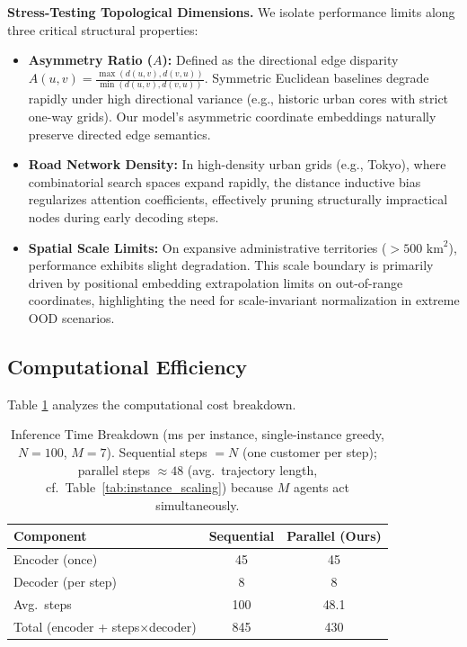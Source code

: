 \documentclass[journal,twoside,web]{ieeecolor}
\theoremstyle{definition}
\theoremstyle{remark}
\theoremstyle{definition}
\begin{document}
\noindent\textbf{Stress-Testing Topological Dimensions.}
We isolate performance limits along three critical structural properties:
\begin{itemize}
\item \textbf{Asymmetry Ratio ($A$):} Defined as the directional edge disparity $A(u, v) = \frac{\max(d(u, v), d(v, u))}{\min(d(u, v), d(v, u))}$. Symmetric Euclidean baselines degrade rapidly under high directional variance (e.g., historic urban cores with strict one-way grids). Our model's asymmetric coordinate embeddings naturally preserve directed edge semantics.
\item \textbf{Road Network Density:} In high-density urban grids (e.g., Tokyo), where combinatorial search spaces expand rapidly, the distance inductive bias regularizes attention coefficients, effectively pruning structurally impractical nodes during early decoding steps.
\item \textbf{Spatial Scale Limits:} On expansive administrative territories ($>500\text{ km}^2$), performance exhibits slight degradation. This scale boundary is primarily driven by positional embedding extrapolation limits on out-of-range coordinates, highlighting the need for scale-invariant normalization in extreme OOD scenarios.
\end{itemize}

\subsection{Computational Efficiency}
Table \ref{tab:inference_time} analyzes the computational cost breakdown.

\begin{table}[h]
\centering
\caption{Inference Time Breakdown (ms per instance, single-instance greedy, $N{=}100$, $M{=}7$). Sequential steps $=N$ (one customer per step); parallel steps $\approx 48$ (avg.\ trajectory length, cf.\ Table~\ref{tab:instance_scaling}) because $M$ agents act simultaneously.}
\label{tab:inference_time}
\begin{tabular}{lcc}
\toprule
\textbf{Component} & \textbf{Sequential} & \textbf{Parallel (Ours)} \\
\midrule
Encoder (once) & 45 & 45 \\
Decoder (per step) & 8 & 8 \\
Avg.\ steps & 100 & 48.1 \\
\midrule
Total (encoder + steps$\times$decoder) & 845 & 430 \\
\bottomrule
\end{tabular}
\end{table}
\end{document}
